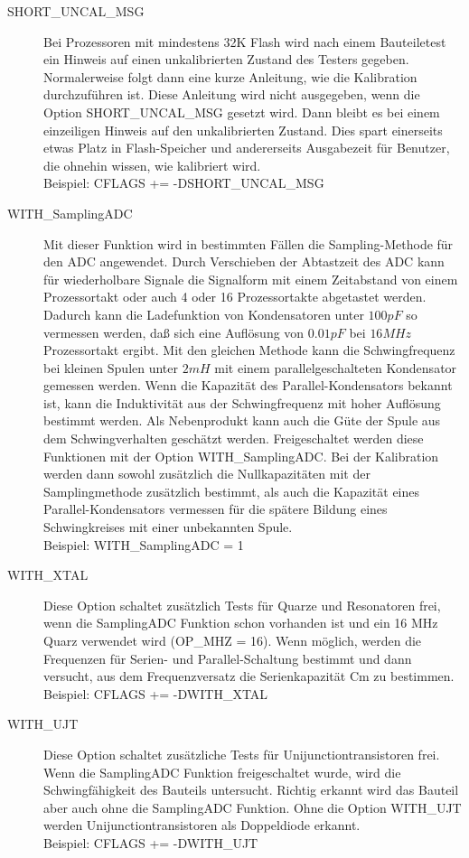 \begin{description}
  \item[SHORT\_UNCAL\_MSG] Bei Prozessoren mit mindestens 32K Flash  wird nach einem Bauteiletest ein Hinweis auf einen unkalibrierten Zustand
des Testers gegeben. Normalerweise folgt dann eine kurze Anleitung, wie die Kalibration durchzuführen ist.
Diese Anleitung wird nicht ausgegeben, wenn die Option SHORT\_UNCAL\_MSG gesetzt wird.
Dann bleibt es bei einem einzeiligen Hinweis auf den unkalibrierten Zustand. 
Dies spart einerseits etwas Platz in Flash-Speicher und andererseits Ausgabezeit für Benutzer,
die ohnehin wissen, wie kalibriert wird.\\
Beispiel: CFLAGS += -DSHORT\_UNCAL\_MSG

  \item[WITH\_SamplingADC] Mit dieser Funktion wird in bestimmten Fällen die Sampling-Methode für den ADC angewendet.
Durch Verschieben der Abtastzeit des ADC kann für wiederholbare Signale die Signalform mit einem Zeitabstand
von einem Prozessortakt oder auch 4 oder 16 Prozessortakte abgetastet werden. Dadurch kann die Ladefunktion von
Kondensatoren unter \(100pF\) so vermessen werden, daß sich eine Auflösung von \(0.01pF\) bei \(16MHz\) Prozessortakt ergibt.
Mit den gleichen Methode kann die Schwingfrequenz bei kleinen Spulen unter \(2mH\) mit einem parallelgeschalteten
Kondensator gemessen werden. Wenn die Kapazität des Parallel-Kondensators bekannt ist, kann die Induktivität aus
der Schwingfrequenz mit hoher Auflösung bestimmt werden. Als Nebenprodukt kann auch die Güte der Spule aus dem
Schwingverhalten geschätzt werden. Freigeschaltet werden diese Funktionen mit der Option WITH\_SamplingADC.
Bei der Kalibration werden dann sowohl zusätzlich die Nullkapazitäten mit der Samplingmethode zusätzlich bestimmt,
als auch die Kapazität eines Parallel-Kondensators vermessen für die spätere Bildung eines Schwingkreises mit einer unbekannten Spule.\\
Beispiel: WITH\_SamplingADC = 1

  \item[WITH\_XTAL]
Diese Option schaltet zusätzlich Tests für Quarze und Resonatoren frei, wenn die SamplingADC Funktion schon vorhanden ist
und ein 16 MHz Quarz verwendet wird (OP\_MHZ = 16).
Wenn möglich, werden die Frequenzen für Serien- und Parallel-Schaltung bestimmt und dann versucht,
aus dem Frequenzversatz die Serienkapazität Cm zu bestimmen.\\
Beispiel: CFLAGS += -DWITH\_XTAL

  \item[WITH\_UJT]
Diese Option schaltet zusätzliche Tests für Unijunctiontransistoren frei. 
Wenn die SamplingADC Funktion freigeschaltet wurde, wird die Schwingfähigkeit des Bauteils untersucht.
Richtig erkannt wird das Bauteil aber auch ohne die SamplingADC Funktion. 
Ohne die Option WITH\_UJT werden Unijunctiontransistoren als Doppeldiode erkannt.\\
Beispiel: CFLAGS += -DWITH\_UJT


\end{description}
